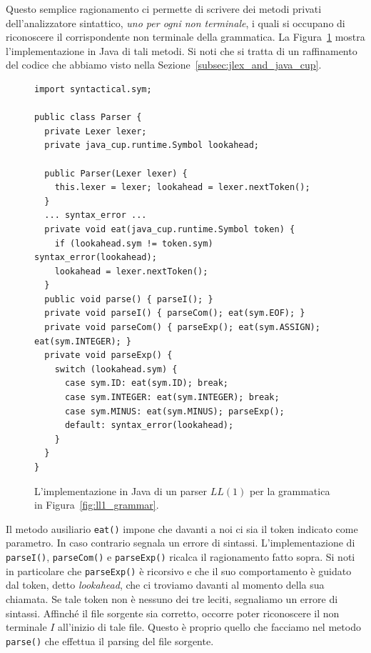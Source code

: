Questo semplice ragionamento ci permette di scrivere dei metodi privati
dell'analizzatore sintattico, \emph{uno per ogni non terminale},
i quali si occupano di riconoscere il corrispondente
non terminale della grammatica.
La Figura~\ref{fig:java_ll1} mostra l'implementazione in Java di tali metodi.
Si noti che si tratta di un raffinamento del codice che abbiamo visto nella
Sezione~\ref{subsec:jlex_and_java_cup}.
%
\begin{figure}[t]
{\small
\begin{verbatim}
import syntactical.sym;

public class Parser {
  private Lexer lexer;
  private java_cup.runtime.Symbol lookahead;

  public Parser(Lexer lexer) {
    this.lexer = lexer; lookahead = lexer.nextToken();
  }
  ... syntax_error ...
  private void eat(java_cup.runtime.Symbol token) {
    if (lookahead.sym != token.sym) syntax_error(lookahead);
    lookahead = lexer.nextToken();     
  }
  public void parse() { parseI(); }
  private void parseI() { parseCom(); eat(sym.EOF); }
  private void parseCom() { parseExp(); eat(sym.ASSIGN); eat(sym.INTEGER); }
  private void parseExp() {
    switch (lookahead.sym) {
      case sym.ID: eat(sym.ID); break;
      case sym.INTEGER: eat(sym.INTEGER); break;
      case sym.MINUS: eat(sym.MINUS); parseExp();
      default: syntax_error(lookahead);
    }
  }
}
\end{verbatim}
}
\caption{L'implementazione in Java di un parser $\mathit{LL}(1)$
         per la grammatica in
         Figura~\ref{fig:ll1_grammar}.}\label{fig:java_ll1}
\end{figure}
%
Il metodo ausiliario
\texttt{eat()} impone che davanti a noi ci sia il token indicato
come parametro. In caso contrario segnala un errore di sintassi.
L'implementazione di \texttt{parseI()}, \texttt{parseCom()}
e \texttt{parseExp()} ricalca il ragionamento fatto sopra. Si noti
in particolare che \texttt{parseExp()} \`e ricorsivo e che il suo
comportamento \`e guidato dal token, detto \emph{lookahead},
che ci troviamo davanti al momento
della sua chiamata. Se tale token non \`e nessuno dei tre leciti, segnaliamo
un errore di sintassi. Affinch\'e il file sorgente sia
corretto, occorre poter riconoscere il non terminale $I$ all'inizio di tale
file. Questo \`e proprio quello che facciamo nel metodo \texttt{parse()}
che effettua il parsing del file sorgente.

